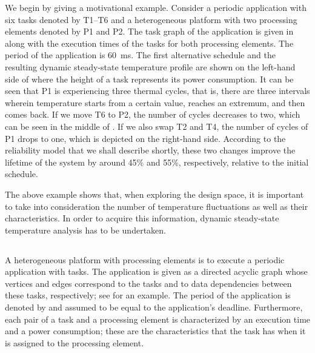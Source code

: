 We begin by giving a motivational example. Consider a periodic application with
six tasks denoted by T1--T6 and a heterogeneous platform with two processing
elements denoted by P1 and P2. The task graph of the application is given in
 along with the execution times of the tasks
for both processing elements. The period of the application is 60~ms. The first
alternative schedule and the resulting dynamic steady-state temperature profile
are shown on the left-hand side of  where the
height of a task represents its power consumption. It can be seen that P1 is
experiencing three thermal cycles, that is, there are three intervals wherein
temperature starts from a certain value, reaches an extremum, and then comes
back. If we move T6 to P2, the number of cycles decreases to two, which can be
seen in the middle of . If we also swap T2 and T4,
the number of cycles of P1 drops to one, which is depicted on the right-hand
side. According to the reliability model that we shall describe shortly, these
two changes improve the lifetime of the system by around 45\% and 55\%,
respectively, relative to the initial schedule.

The above example shows that, when exploring the design space, it is important
to take into consideration the number of temperature fluctuations as well as
their characteristics. In order to acquire this information, dynamic
steady-state temperature analysis has to be undertaken.

\subsection{\problemtitle}

A heterogeneous platform with \np processing elements is to execute a periodic
application with \nt tasks. The application is given as a directed acyclic graph
whose vertices and edges correspond to the tasks and to data dependencies
between these tasks, respectively; see  for an
example. The period of the application is denoted by \period and assumed to be
equal to the application's deadline. Furthermore, each pair of a task and a
processing element is characterized by an execution time and a power
consumption; these are the characteristics that the task has when it is assigned
to the processing element.

